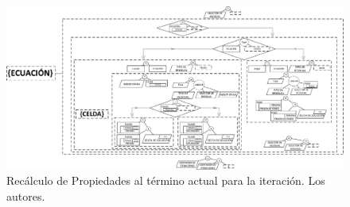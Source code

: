 \begin{figure}[h]
	\centering%
	\includegraphics[width=\linewidth]{Fig/ActualizacionDeIncognitas.pdf}%
	\caption[Recálculo de Propiedades al término actual para la iteración.]{Recálculo de Propiedades al término actual para la iteración. Los autores.} \label{fig:UpdateVariables}
\end{figure}


